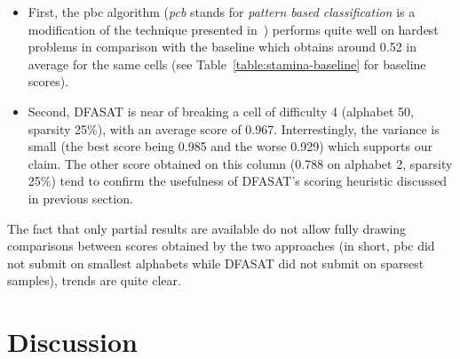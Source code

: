 \begin{itemize}

\item First, the pbc algorithm (\emph{pcb} stands for \emph{pattern based classification} is a modification of the technique presented in~\cite{Lo:2009}) performs quite well on hardest problems in comparison with the baseline which obtains around 0.52 in average for the same cells (see Table~\ref{table:stamina-baseline} for baseline scores). 

\item Second, DFASAT is near of breaking a cell of difficulty 4 (alphabet 50, sparsity 25\%), with an average score of 0.967. Interrestingly, the variance is small (the best score being 0.985 and the worse 0.929) which supports our claim. The other score obtained on this column (0.788 on alphabet 2, sparsity 25\%) tend to confirm the usefulness of DFASAT's scoring heuristic discussed in previous section. 

\end{itemize}

The fact that only partial results are available do not allow fully drawing comparisons between scores obtained by the two approaches (in short, pbc did not submit on smallest alphabets while DFASAT did not submit on sparsest samples), trends are quite clear.


\section{Discussion\label{section:stamina-discussion}}

